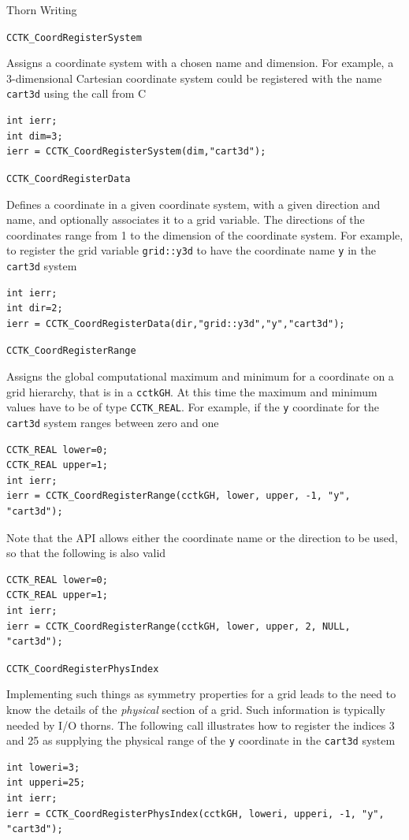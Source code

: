 \begin{cactuspart}{Thorn Writing}
\begin{Lentry}
\item[\texttt{CCTK\_CoordRegisterSystem}]

Assigns a coordinate system with a chosen name and dimension. For example,
a 3-dimensional Cartesian coordinate system could be registered with the
name \texttt{cart3d} using the call from C
%
\begin{verbatim}
int ierr;
int dim=3;
ierr = CCTK_CoordRegisterSystem(dim,"cart3d");
\end{verbatim}

\item[\texttt{CCTK\_CoordRegisterData}]

Defines a coordinate in a given coordinate system, with a given
        direction and name, and optionally associates it to a grid variable.
The directions of the coordinates range from 1 to the dimension of the
coordinate system. For example, to register the grid variable \texttt{grid::y3d}
to have the coordinate name \texttt{y} in the \texttt{cart3d} system
%
\begin{verbatim}
int ierr;
int dir=2;
ierr = CCTK_CoordRegisterData(dir,"grid::y3d","y","cart3d");
\end{verbatim}

\item[\texttt{CCTK\_CoordRegisterRange}]

Assigns the global computational maximum and minimum for a coordinate
on a grid hierarchy, that is in a \texttt{cctkGH}. At this time the
maximum and minimum values have to be of type \texttt{CCTK\_REAL}. For
example, if the \texttt{y} coordinate for the \texttt{cart3d} system ranges
between zero and one
%
\begin{verbatim}
CCTK_REAL lower=0;
CCTK_REAL upper=1;
int ierr;
ierr = CCTK_CoordRegisterRange(cctkGH, lower, upper, -1, "y", "cart3d");
\end{verbatim}
%
Note that the API allows either the coordinate name or the direction to
be used, so that the following is also valid
%
\begin{verbatim}
CCTK_REAL lower=0;
CCTK_REAL upper=1;
int ierr;
ierr = CCTK_CoordRegisterRange(cctkGH, lower, upper, 2, NULL, "cart3d");
\end{verbatim}

\item[\texttt{CCTK\_CoordRegisterPhysIndex}]

Implementing such things as symmetry properties for a grid leads to
the need to know the details of the \emph{physical} section of a grid.
Such information is typically needed by I/O thorns. The following call
illustrates how to register the
indices 3 and 25 as supplying the physical range of the \texttt{y}
coordinate in the \texttt{cart3d} system
%
\begin{verbatim}
int loweri=3;
int upperi=25;
int ierr;
ierr = CCTK_CoordRegisterPhysIndex(cctkGH, loweri, upperi, -1, "y", "cart3d");
\end{verbatim}




\end{Lentry}
\end{cactuspart}
